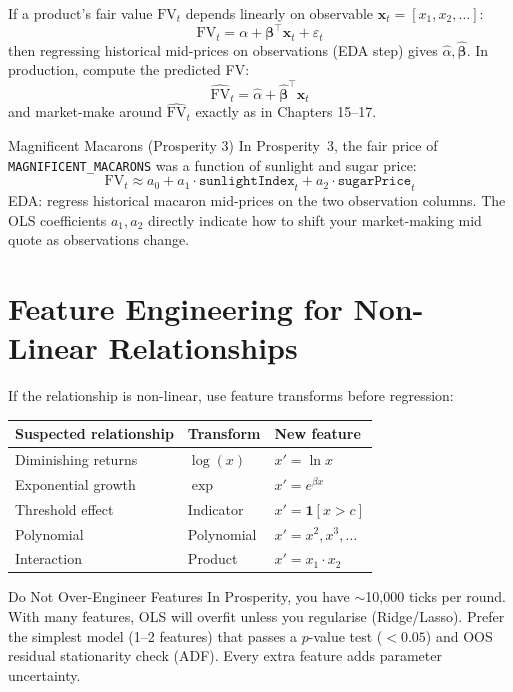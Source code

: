 \documentclass[12pt,a4paper,openany]{report}
\theoremstyle{definition}
\begin{document}
If a product's fair value $\text{FV}_t$ depends linearly on observable $\mathbf{x}_t = [x_1, x_2, \ldots]$:
\[
  \text{FV}_t = \alpha + \boldsymbol{\beta}^{\top}\mathbf{x}_t + \varepsilon_t
\]
then regressing historical mid-prices on observations (EDA step) gives $\hat{\alpha},\hat{\boldsymbol{\beta}}$. In production, compute the predicted FV:
\[
  \widehat{\text{FV}}_t = \hat{\alpha} + \hat{\boldsymbol{\beta}}^{\top}\mathbf{x}_t
\]
and market-make around $\widehat{\text{FV}}_t$ exactly as in Chapters 15–17.

\begin{examplebox}{Magnificent Macarons (Prosperity 3)}
In Prosperity~3, the fair price of \texttt{MAGNIFICENT\_MACARONS} was a function of sunlight and sugar price:
\[
  \text{FV}_t \approx a_0 + a_1 \cdot \texttt{sunlightIndex}_t + a_2 \cdot \texttt{sugarPrice}_t
\]
EDA: regress historical macaron mid-prices on the two observation columns. The OLS coefficients $a_1, a_2$ directly indicate how to shift your market-making mid quote as observations change.
\end{examplebox}

\section{Feature Engineering for Non-Linear Relationships}

If the relationship is non-linear, use feature transforms before regression:

\begin{center}
\renewcommand{\arraystretch}{1.3}
\begin{tabular}{lll}
\toprule
\textbf{Suspected relationship} & \textbf{Transform} & \textbf{New feature} \\
\midrule
Diminishing returns & $\log(x)$ & $x' = \ln x$ \\
Exponential growth & $\exp$ & $x' = e^{\beta x}$ \\
Threshold effect & Indicator & $x' = \mathbf{1}[x > c]$ \\
Polynomial & Polynomial & $x' = x^2, x^3, \ldots$ \\
Interaction & Product & $x' = x_1 \cdot x_2$ \\
\bottomrule
\end{tabular}
\end{center}

\begin{warningbox}{Do Not Over-Engineer Features}
In Prosperity, you have $\sim$10{,}000 ticks per round. With many features, OLS will overfit unless you regularise (Ridge/Lasso). Prefer the simplest model (1–2 features) that passes a $p$-value test ($< 0.05$) and OOS residual stationarity check (ADF). Every extra feature adds parameter uncertainty.
\end{warningbox}
\end{document}
